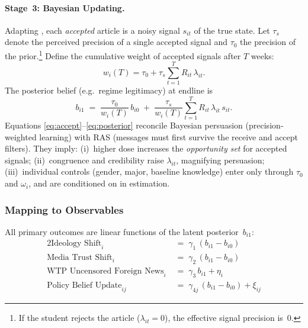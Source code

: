 \documentclass[12pt, american]{article}
\begin{document}
\paragraph{Stage~3: Bayesian Updating.}
Adapting \citet{kamenica2011bayesian}, each \emph{accepted} article is a noisy
signal $s_{it}$ of the true state.  Let $\tau_s$ denote the perceived
precision of a single accepted signal and $\tau_0$ the precision of the
prior.\footnote{If the student rejects the article ($\lambda_{it}=0$), the
effective signal precision is~$0$.}
Define the cumulative weight of accepted signals after $T$ weeks:
%
\begin{equation}
w_i(T)
= \tau_0 + \tau_s
\sum_{t=1}^{T}  R_{it}\,\lambda_{it}.
\label{eq:weight}
\end{equation}
%
The posterior belief (e.g.\ regime legitimacy) at endline is
%
\begin{equation}
b_{i1}
  \;=\;
\frac{\tau_0}{w_i(T)}\,b_{i0}
\;+\;
\frac{\tau_s}{w_i(T)}
      \sum_{t=1}^{T} R_{it}\,\lambda_{it}\,s_{it}.
\label{eq:posterior}
\end{equation}
%
Equations \eqref{eq:accept}–\eqref{eq:posterior} reconcile
Bayesian persuasion (precision‐weighted learning) with
RAS (messages must first survive the receive and accept filters).
They imply: (i)~higher dose increases the \emph{opportunity set} for
accepted signals; (ii)~congruence and credibility raise $\lambda_{it}$,
magnifying persuasion; (iii)~individual controls (gender, major, baseline
knowledge) enter only through $\tau_0$ and $\omega_i$, and are conditioned on
in estimation.

\subsubsection{Mapping to Observables}

All primary outcomes are linear functions of the latent
posterior~$b_{i1}$:
%
\begin{alignat}{2}
\text{Ideology Shift}_{i} \;          &=\; \gamma_{1}\,(b_{i1}-b_{i0})                           \\
\text{Media Trust Shift}_{i} \;       &=\; \gamma_{2}\,(b_{i1}-b_{i0})                           \\
\text{WTP Uncensored Foreign News}_{i} \; &=\; \gamma_{3}\,b_{i1} + \eta_i                      \\
\text{Policy Belief Update}_{ij} \;   &=\; \gamma_{4j}\,(b_{i1}-b_{i0}) + \xi_{ij}
\end{alignat}
\end{document}
